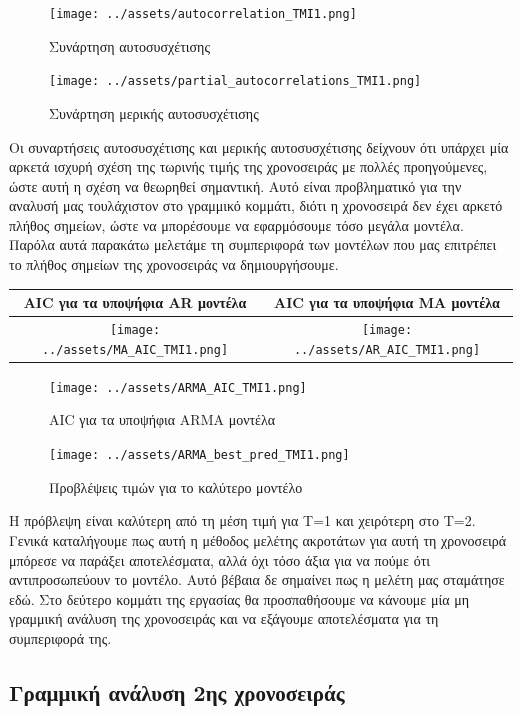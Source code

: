 \documentclass[11pt,]{article}
\begin{document}
\begin{figure}
\centering
\texttt{[image: ../assets/autocorrelation\_TMI1.png]}
\caption{Συνάρτηση αυτοσυσχέτισης}
\end{figure}

\begin{figure}
\centering
\texttt{[image: ../assets/partial\_autocorrelations\_TMI1.png]}
\caption{Συνάρτηση μερικής αυτοσυσχέτισης}
\end{figure}

Οι συναρτήσεις αυτοσυσχέτισης και μερικής αυτοσυσχέτισης δείχνουν ότι
υπάρχει μία αρκετά ισχυρή σχέση της τωρινής τιμής της χρονοσειράς με
πολλές προηγούμενες, ώστε αυτή η σχέση να θεωρηθεί σημαντική. Αυτό είναι
προβληματικό για την αναλυσή μας τουλάχιστον στο γραμμικό κομμάτι, διότι
η χρονοσειρά δεν έχει αρκετό πλήθος σημείων, ώστε να μπορέσουμε να
εφαρμόσουμε τόσο μεγάλα μοντέλα. Παρόλα αυτά παρακάτω μελετάμε τη
συμπεριφορά των μοντέλων που μας επιτρέπει το πλήθος σημείων της
χρονοσειράς να δημιουργήσουμε.

\begin{longtable}[]{@{}cc@{}}
\toprule
AIC για τα υποψήφια AR μοντέλα & AIC για τα υποψήφια MA
μοντέλα\tabularnewline
\midrule
\endhead
\texttt{[image: ../assets/MA\_AIC\_TMI1.png]}
&
\texttt{[image: ../assets/AR\_AIC\_TMI1.png]}\tabularnewline
\bottomrule
\end{longtable}

\begin{figure}
\centering
\texttt{[image: ../assets/ARMA\_AIC\_TMI1.png]}
\caption{AIC για τα υποψήφια ARMA μοντέλα}
\end{figure}

\begin{figure}
\centering
\texttt{[image: ../assets/ARMA\_best\_pred\_TMI1.png]}
\caption{Προβλέψεις τιμών για το καλύτερο μοντέλο}
\end{figure}

H πρόβλεψη είναι καλύτερη από τη μέση τιμή για T=1 και χειρότερη στο
T=2. Γενικά καταλήγουμε πως αυτή η μέθοδος μελέτης ακροτάτων για αυτή τη
χρονοσειρά μπόρεσε να παράξει αποτελέσματα, αλλά όχι τόσο άξια για να
πούμε ότι αντιπροσωπεύουν το μοντέλο. Αυτό βέβαια δε σημαίνει πως η
μελέτη μας σταμάτησε εδώ. Στο δεύτερο κομμάτι της εργασίας θα
προσπαθήσουμε να κάνουμε μία μη γραμμική ανάλυση της χρονοσειράς και να
εξάγουμε αποτελέσματα για τη συμπεριφορά της.

\hypertarget{ux3b3ux3c1ux3b1ux3bcux3bcux3b9ux3baux3ae-ux3b1ux3bdux3acux3bbux3c5ux3c3ux3b7-2ux3b7ux3c2-ux3c7ux3c1ux3bfux3bdux3bfux3c3ux3b5ux3b9ux3c1ux3acux3c2}{%
\subsection{Γραμμική ανάλυση 2ης
χρονοσειράς}\label{ux3b3ux3c1ux3b1ux3bcux3bcux3b9ux3baux3ae-ux3b1ux3bdux3acux3bbux3c5ux3c3ux3b7-2ux3b7ux3c2-ux3c7ux3c1ux3bfux3bdux3bfux3c3ux3b5ux3b9ux3c1ux3acux3c2}}
\end{document}
